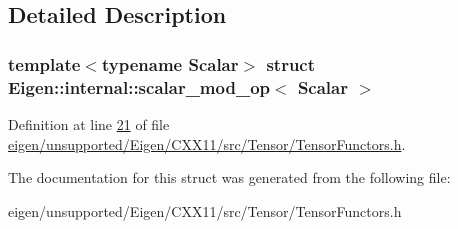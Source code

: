 \subsection{Detailed Description}
\subsubsection*{template$<$typename Scalar$>$\newline
struct Eigen\+::internal\+::scalar\+\_\+mod\+\_\+op$<$ Scalar $>$}



Definition at line \hyperlink{eigen_2unsupported_2_eigen_2_c_x_x11_2src_2_tensor_2_tensor_functors_8h_source_l00021}{21} of file \hyperlink{eigen_2unsupported_2_eigen_2_c_x_x11_2src_2_tensor_2_tensor_functors_8h_source}{eigen/unsupported/\+Eigen/\+C\+X\+X11/src/\+Tensor/\+Tensor\+Functors.\+h}.



The documentation for this struct was generated from the following file\+:\begin{DoxyCompactItemize}
\item 
eigen/unsupported/\+Eigen/\+C\+X\+X11/src/\+Tensor/\+Tensor\+Functors.\+h\end{DoxyCompactItemize}
